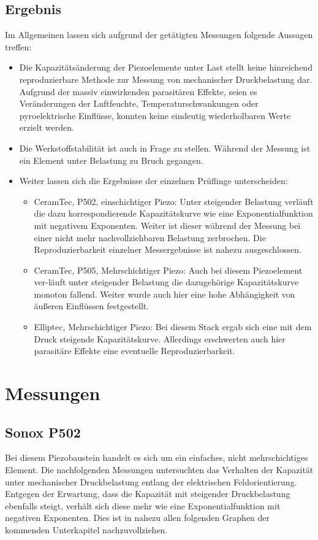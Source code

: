 \documentclass[11pt]{scrreprt} %
\begin{document}
\section{Ergebnis}

Im Allgemeinen lassen sich aufgrund der getätigten Messungen folgende Aussagen treffen:
\begin{itemize}
\item
Die Kapazitätsänderung der Piezoelemente unter Last stellt keine hinreichend reproduzierbare Methode zur Messung von mechanischer Druckbelastung dar. Aufgrund der massiv einwirkenden parasitären Effekte, seien es Veränderungen der Luftfeuchte, Temperaturschwankungen oder pyroelektrische Einflüsse, konnten keine eindeutig wiederholbaren Werte erzielt werden.
\item
Die Werkstoffstabilität ist auch in Frage zu stellen. Während der Messung ist ein Element unter Belastung zu Bruch gegangen.
\item
Weiter lassen sich die Ergebnisse der einzelnen Prüflinge unterscheiden:
\begin{itemize}
\item
CeramTec, P502, einschichtiger Piezo: Unter steigender Belastung verläuft die dazu korrespondierende Kapazitätskurve wie eine Exponentialfunktion mit negativem Exponenten. Weiter ist dieser während der Messung bei einer nicht mehr nachvollziehbaren Belastung zerbrochen. Die Reproduzierbarkeit einzelner Messergebnisse ist nahezu ausgeschlossen.
\item
CeramTec, P505, Mehrschichtiger Piezo: Auch bei diesem Piezoelement ver-läuft unter steigender Belastung die dazugehörige Kapazitätskurve monoton fallend. Weiter wurde auch hier eine hohe Abhängigkeit von äußeren Einflüssen festgestellt.
\item
Elliptec, Mehrschichtiger Piezo: Bei diesem Stack ergab sich eine mit dem Druck steigende Kapazitätskurve. Allerdings erschwerten auch hier parasitäre Effekte eine eventuelle Reproduzierbarkeit.
\end{itemize}
\end{itemize}


\chapter{Messungen}

\section{Sonox P502} 
Bei diesem Piezobaustein handelt es sich um ein einfaches, nicht mehrschichtiges Element. Die nachfolgenden Messungen untersuchten das Verhalten der Kapazität unter mechanischer Druckbelastung entlang der elektrischen Feldorientierung. Entgegen der Erwartung, dass die Kapazität mit steigender Druckbelastung ebenfalls steigt, verhält sich diese mehr wie eine Exponentialfunktion mit negativen Exponenten. Dies ist in nahezu allen folgenden Graphen der kommenden Unterkapitel nachzuvollziehen.
\end{document}
